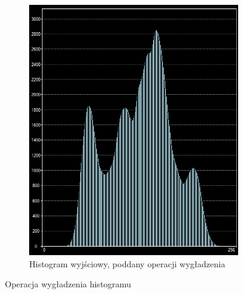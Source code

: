 \begin{figure}
\begin{subfigure}[b]{0.45\textwidth}
    \includegraphics[width=\textwidth]{img/smooth-histogram-after}
    \caption{Histogram wyjściowy, poddany operacji wygładzenia}
    \label{fig:equalize_histogram_after}
  \end{subfigure}
  \caption{Operacja wygładzenia histogramu}\label{fig:histogram_smooth}
\end{figure}

